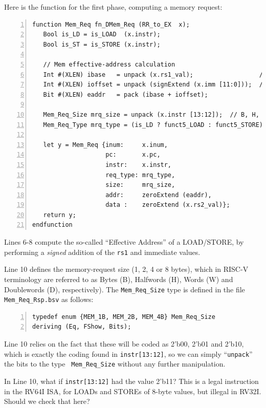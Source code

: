Here is the function for the first phase, computing a memory request:

{\small
\begin{Verbatim}[frame=single, numbers=left]
function Mem_Req fn_DMem_Req (RR_to_EX  x);
   Bool is_LD = is_LOAD  (x.instr);
   Bool is_ST = is_STORE (x.instr);

   // Mem effective-address calculation
   Int #(XLEN) ibase   = unpack (x.rs1_val);                  // Signed
   Int #(XLEN) ioffset = unpack (signExtend (x.imm [11:0]));  // Signed
   Bit #(XLEN) eaddr   = pack (ibase + ioffset);

   Mem_Req_Size mrq_size = unpack (x.instr [13:12]);  // B, H, W or D
   Mem_Req_Type mrq_type = (is_LD ? funct5_LOAD : funct5_STORE);

   let y = Mem_Req {inum:     x.inum,
                    pc:       x.pc,
                    instr:    x.instr,
                    req_type: mrq_type,
                    size:     mrq_size,
                    addr:     zeroExtend (eaddr),
                    data :    zeroExtend (x.rs2_val)};
   return y;
endfunction
\end{Verbatim}
}

Lines 6-8 compute the so-called ``Effective Address'' of a LOAD/STORE,
by performing a \emph{signed} addition of the {\tt rs1} and immediate
values.

Line 10 defines the memory-request size (1, 2, 4 or 8 bytes), which in
RISC-V terminology are referred to as Bytes (B), Halfwords (H), Words
(W) and Doublewords (D), respectively).  The {\tt Mem\_Req\_Size} type
is defined in the file {\tt Mem\_Req\_Rsp.bsv} as follows:

{\small
\begin{Verbatim}[frame=single, numbers=left]
typedef enum {MEM_1B, MEM_2B, MEM_4B} Mem_Req_Size
deriving (Eq, FShow, Bits);
\end{Verbatim}
}

Line 10 relies on the fact that these will be coded as 2'b00, 2'b01
and 2'b10, which is exactly the coding found in {\tt instr[13:12]}, so
we can simply ``{\tt unpack}'' the bits to the type {\tt
Mem\_Req\_Size} without any further manipulation.

\hdivider

\Exercise

In Line 10, what if {\tt instr[13:12]} had the value 2'b11?  This is a
legal instruction in the RV64I ISA, for LOADs and STOREs of 8-byte
values, but illegal in RV32I.  Should we check that here?


